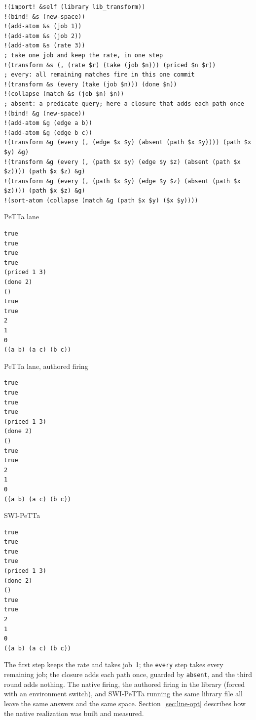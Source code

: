 \documentclass[11pt]{article}
\newcommand{\code}[1]{\texttt{#1}}
\newcommand{\outhead}[1]{{\footnotesize\sffamily #1}\par\vspace{1pt}}
\newcommand{\PeTTa}{\textup{PeTTa}}
\begin{document}
\begin{lstlisting}[style=metta,caption={\code{transform} on the PeTTa lane},label={lst:t08}]
!(import! &self (library lib_transform))
!(bind! &s (new-space))
!(add-atom &s (job 1))
!(add-atom &s (job 2))
!(add-atom &s (rate 3))
; take one job and keep the rate, in one step
!(transform &s (, (rate $r) (take (job $n))) (priced $n $r))
; every: all remaining matches fire in this one commit
!(transform &s (every (take (job $n))) (done $n))
!(collapse (match &s (job $n) $n))
; absent: a predicate query; here a closure that adds each path once
!(bind! &g (new-space))
!(add-atom &g (edge a b))
!(add-atom &g (edge b c))
!(transform &g (every (, (edge $x $y) (absent (path $x $y)))) (path $x $y) &g)
!(transform &g (every (, (path $x $y) (edge $y $z) (absent (path $x $z)))) (path $x $z) &g)
!(transform &g (every (, (path $x $y) (edge $y $z) (absent (path $x $z)))) (path $x $z) &g)
!(sort-atom (collapse (match &g (path $x $y) ($x $y))))
\end{lstlisting}
\noindent\begin{minipage}[t]{0.32\textwidth}
\outhead{PeTTa lane}
\begin{lstlisting}[style=out]
true
true
true
true
(priced 1 3)
(done 2)
()
true
true
2
1
0
((a b) (a c) (b c))
\end{lstlisting}
\end{minipage}\hfill
\begin{minipage}[t]{0.32\textwidth}
\outhead{PeTTa lane, authored firing}
\begin{lstlisting}[style=out]
true
true
true
true
(priced 1 3)
(done 2)
()
true
true
2
1
0
((a b) (a c) (b c))
\end{lstlisting}
\end{minipage}\hfill
\begin{minipage}[t]{0.32\textwidth}
\outhead{SWI-PeTTa}
\begin{lstlisting}[style=out]
true
true
true
true
(priced 1 3)
(done 2)
()
true
true
2
1
0
((a b) (a c) (b c))
\end{lstlisting}
\end{minipage}

\noindent
The first step keeps the rate and takes job~1; the \code{every} step takes
every remaining job; the closure adds each path once, guarded by
\code{absent}, and the third round adds nothing.  The native firing, the
authored firing in the library (forced with an environment switch), and
SWI-\PeTTa{} running the same library file all leave the same answers and the
same space.  Section~\ref{sec:line-opt} describes how the native realization
was built and measured.
\end{document}
